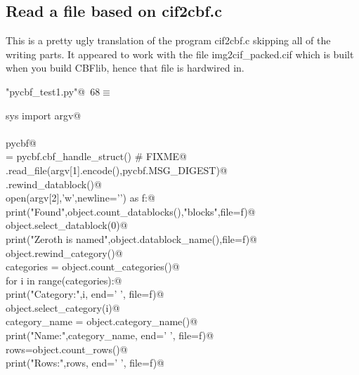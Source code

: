 \documentclass[10pt,a4paper,twoside,notitlepage]{article}
\begin{document}
\subsection{Read a file based on cif2cbf.c}

This is a pretty ugly translation of the program cif2cbf.c skipping
all of the writing parts. 
It appeared to work with the file img2cif\_packed.cif which is built
when you build CBFlib, hence that file is hardwired in.

\begin{flushleft} \small
\begin{minipage}{\linewidth}\label{scrap13}\raggedright\small
{} \verb@"pycbf_test1.py"@\nobreak\ {\footnotesize {68}}$\equiv$
\vspace{-1ex}
\begin{list}{}{} \item
\mbox{}\verb@from sys import argv@\\
\mbox{}\verb@@\\
\mbox{}\verb@import pycbf@\\
\mbox{}\verb@object = pycbf.cbf_handle_struct() # FIXME@\\
\mbox{}\verb@object.read_file(argv[1].encode(),pycbf.MSG_DIGEST)@\\
\mbox{}\verb@object.rewind_datablock()@\\
\mbox{}\verb@with open(argv[2],'w',newline='\n') as f:@\\
\mbox{}\verb@    print("Found",object.count_datablocks(),"blocks",file=f)@\\
\mbox{}\verb@    object.select_datablock(0)@\\
\mbox{}\verb@    print("Zeroth is named",object.datablock_name(),file=f)@\\
\mbox{}\verb@    object.rewind_category()@\\
\mbox{}\verb@    categories = object.count_categories()@\\
\mbox{}\verb@    for i in range(categories):@\\
\mbox{}\verb@        print("Category:",i, end=' ', file=f)@\\
\mbox{}\verb@        object.select_category(i)@\\
\mbox{}\verb@        category_name = object.category_name()@\\
\mbox{}\verb@        print("Name:",category_name, end=' ', file=f)@\\
\mbox{}\verb@        rows=object.count_rows()@\\
\mbox{}\verb@        print("Rows:",rows, end=' ', file=f)@\\

\end{list}
\end{minipage}
\end{flushleft}
\end{document}
